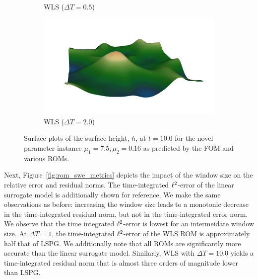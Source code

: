 \begin{figure}
\begin{center}
\begin{subfigure}[t]{0.49\textwidth}
\caption{WLS ($\Delta T = 0.5$)}
\end{subfigure}
\begin{subfigure}[t]{0.49\textwidth}
\includegraphics[trim={4cm 0cm 2cm 2cm},clip,width=1.0\linewidth]{figs/swe/h_wls_DT20_t50.png}
\caption{WLS ($\Delta T=2.0$)}
\end{subfigure}
\caption{Surface plots of the surface height, $h$, at $t=10.0$ for the novel parameter instance $\mu_1 = 7.5,\mu_2 = 0.16$ as predicted by the FOM and various ROMs.} 
\label{fig:rom_hsols_swe}
\end{center}
\end{figure}

Next, Figure~\ref{fig:rom_swe_metrics} depicts the impact of the window size on the relative error and residual norms. The time-integrated $\ell^2$-error of the linear surrogate model is additionally shown for reference. We make the same observations as before: increasing the window size leads to a monotonic decrease in the time-integrated residual norm, but not in the time-integrated error norm. We observe that the time integrated $\ell^2$-error is lowest for an intermeidate window size. At $\Delta T = 1$, the time-integrated $\ell^2$-error of the WLS ROM is approximately half that of LSPG. We additionally note that all ROMs are significantly more accurate than the linear surrogate model. Similarly, WLS with $\Delta T = 10.0$ yields a time-integrated residual norm that is almost three orders of magnitude lower than LSPG. 


